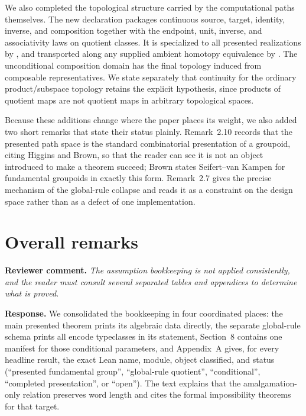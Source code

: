 \documentclass[11pt]{article}
\newcommand{\review}[1]{\par\medskip\noindent
  \textbf{\color{blue!55!black}Reviewer comment.} \emph{#1}\par}
\newcommand{\response}{\par\smallskip\noindent
  \textbf{\color{green!35!black}Response.} }
\begin{document}
We also completed the topological structure carried by the computational paths
themselves.  The new declaration
 packages continuous source,
target, identity, inverse, and composition together with the endpoint, unit,
inverse, and associativity laws on quotient classes.  It is specialized to all
presented realizations by
, and transported
along any supplied ambient homotopy equivalence by
.  The unconditional
composition domain has the final topology induced from composable
representatives.  We state separately that continuity for the ordinary
product/subspace topology retains the explicit
 hypothesis, since products of quotient
maps are not quotient maps in arbitrary topological spaces.

Because these additions change where the paper places its weight, we also
added two short remarks that state their status plainly.  Remark~2.10 records
that the presented path space is the standard combinatorial presentation of a
groupoid, citing Higgins and Brown, so that the reader can see it is not an
object introduced to make a theorem succeed; Brown states Seifert--van Kampen
for fundamental groupoids in exactly this form.  Remark~2.7 gives the precise
mechanism of the global-rule collapse and reads it as a constraint on the
design space rather than as a defect of one implementation.

\section*{Overall remarks}

\review{The assumption bookkeeping is not applied consistently, and the reader
must consult several separated tables and appendices to determine what is
proved.}
\response
We consolidated the bookkeeping in four coordinated places: the main
presented theorem prints its algebraic data directly, the separate global-rule
schema prints all encode typeclasses in its statement, Section~8 contains one
manifest for those conditional parameters, and Appendix~A gives, for every
headline result, the exact Lean name, module, object classified, and status
(``presented fundamental group'', ``global-rule quotient'', ``conditional'',
``completed presentation'', or ``open'').
The text explains that the amalgamation-only relation preserves word length
and cites the formal impossibility theorems for that target.
\end{document}
